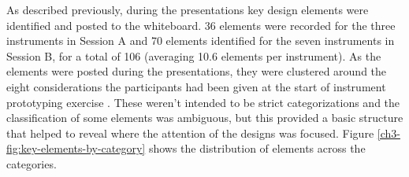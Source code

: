 \documentclass[letterpaper, 12pt]{article}
\begin{document}



As described previously, during the presentations key design elements were identified and posted to the whiteboard. 
36 elements were recorded for the three instruments in Session A and 70 elements identified for the seven instruments in Session B, for a total of 106 (averaging 10.6 elements per instrument). As the elements were posted during the presentations, they were clustered around the eight considerations the participants had been given at the start of instrument prototyping exercise . These weren't intended to be strict categorizations and the classification of some elements was ambiguous, but this provided a basic structure that helped to reveal where the attention of the designs was focused. Figure \ref{ch3-fig:key-elements-by-category} shows the distribution of elements across the categories. 
\end{document}
